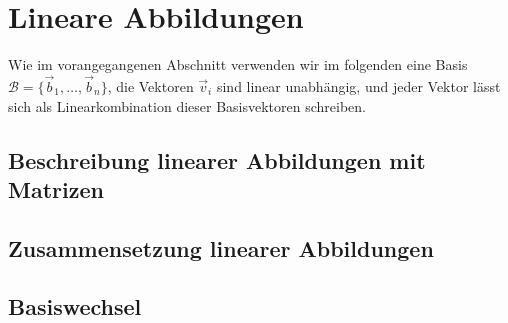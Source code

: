 %
%
%
\section{Lineare Abbildungen%
\label{skript:section:lineare abbildungen}}
Wie im vorangegangenen Abschnitt verwenden wir im folgenden eine Basis
$\mathcal{B}=\{\vec{b}_1,\dots,\vec{b}_n\}$, die Vektoren $\vec{v}_i$
sind linear unabhängig, und jeder Vektor lässt sich als Linearkombination
dieser Basisvektoren schreiben.

%
%
\subsection{Beschreibung linearer Abbildungen mit Matrizen}

%
%
\subsection{Zusammensetzung linearer Abbildungen}

%
%
\subsection{Basiswechsel}


